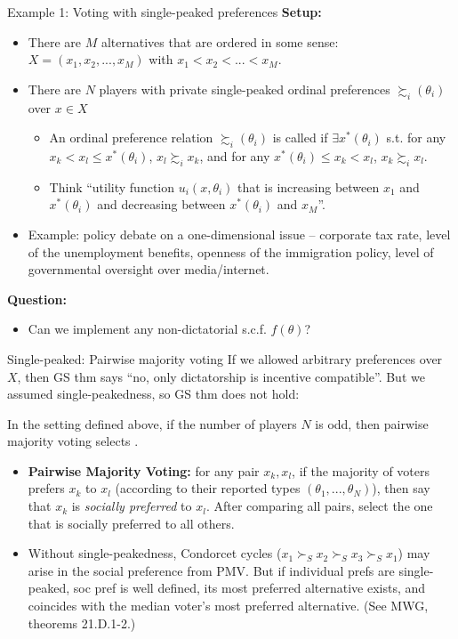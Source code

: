 \documentclass[english,10pt
,aspectratio=169
]{beamer}
\begin{document}
\begin{frame}{Example 1: Voting with single-peaked preferences}
	\textbf{Setup:}
	\begin{itemize}
		\item There are $M$ alternatives that are ordered in some sense: \\
		$X = (x_1, x_2, ..., x_M)$ with $x_1 < x_2 < ... < x_M$.
		\item There are $N$ players with private single-peaked ordinal preferences $\succsim_i(\theta_i)$ over $x \in X$
		\begin{itemize}
			\item An ordinal preference relation $\succsim_i(\theta_i)$ is called  if $\exists x^*(\theta_i)$ s.t. for any $x_k < x_l\leq x^*(\theta_i)$, $x_l \succsim_i x_k$, and for any $x^*(\theta_i) \leq x_k < x_l$, $x_k \succsim_i x_l$.
			\item Think ``utility function $u_i(x,\theta_i)$ that is increasing between $x_1$ and $x^*(\theta_i)$ and decreasing between $x^*(\theta_i)$ and $x_M$''.
		\end{itemize}
		\item \alert{Example}: policy debate on a one-dimensional issue -- corporate tax rate, level of the unemployment benefits, openness of the immigration policy, level of governmental oversight over media/internet.
	\end{itemize}
	\textbf{Question:}
	\begin{itemize}
		\item Can we implement any non-dictatorial s.c.f. $f(\theta)$?
	\end{itemize}
\end{frame}


\begin{frame}{Single-peaked: Pairwise majority voting}
	If we allowed arbitrary preferences over $X$, then GS thm says ``no, only dictatorship is incentive compatible''. But we assumed single-peakedness, so GS thm does not hold:
	\begin{theorem}
		In the setting defined above, if the number of players $N$ is odd, then \alert{pairwise majority voting} selects .
	\end{theorem}
	\begin{itemize}
		\item \textbf{Pairwise Majority Voting:} for any pair $x_k, x_l$, if the majority of voters prefers $x_k$ to $x_l$ (according to their reported types $(\theta_1,...,\theta_N)$), then say that $x_k$ is \emph{socially preferred} to $x_l$. After comparing all pairs, select the one that is socially preferred to all others.
		\item Without single-peakedness, Condorcet cycles ($x_1 \succ_S x_2 \succ_S x_3 \succ_S x_1$) may arise in the social preference from PMV. But if individual prefs are single-peaked, soc pref is well defined, its most preferred alternative exists, and coincides with the median voter's most preferred alternative. (See MWG, theorems 21.D.1-2.)
	\end{itemize}
\end{frame}
\end{document}
